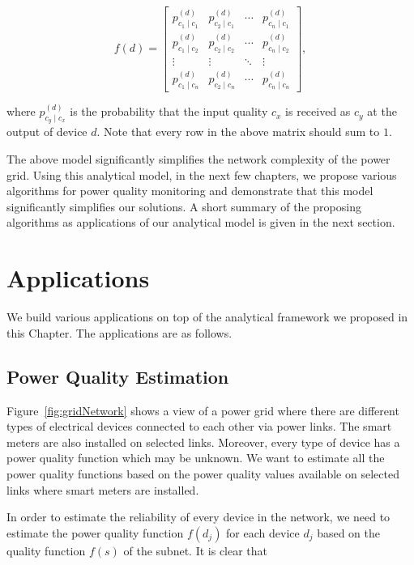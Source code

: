 \begin{equation}
f(d) = \left[\begin{array}{cccc} p_{c_1 \mid c_1}^{(d)} & p_{c_2 \mid c_1}^{(d)} & \cdots & p_{c_n \mid c_1}^{(d)}\\
p_{c_1 \mid c_2}^{(d)} & p_{c_2 \mid c_2}^{(d)} & \cdots & p_{c_n \mid c_2}^{(d)}\\
\vdots & \vdots& \ddots & \vdots\\
p_{c_1 \mid c_n}^{(d)} & p_{c_2 \mid c_n}^{(d)} & \cdots & p_{c_n \mid c_n}^{(d)}
\end{array}\right],
\label{eqn:pqf}
\end{equation}

\noindent
where $p_{c_y \mid c_x}^{(d)}$ is the probability that the input quality $c_x$ is received as $c_y$ at the output of device $d$. Note that every row in the above matrix should sum to $1$. 

The above model significantly simplifies the network complexity of the power grid. Using this analytical model, in the next few chapters, we propose various algorithms for power quality monitoring and demonstrate that this model significantly simplifies our solutions. A short summary of the proposing algorithms as applications of our analytical model is given in the next section.

\section{Applications}
We build various applications on top of the analytical framework we proposed in this Chapter. The applications are as follows.

\subsection{Power Quality Estimation}
Figure~\ref{fig:gridNetwork} shows a view of a power grid where there are different types of electrical devices connected to each other via power links. The smart meters are also installed on selected links. Moreover, every type of device has a power quality function which may be unknown. We want to estimate all the power quality functions based on the power quality values available on selected links where smart meters are installed.

In order to estimate the reliability of every device in the network, we need to estimate the power quality function $f(d_j)$ for each device $d_j$ based on the quality function $f(s)$ of the subnet. It is clear that

